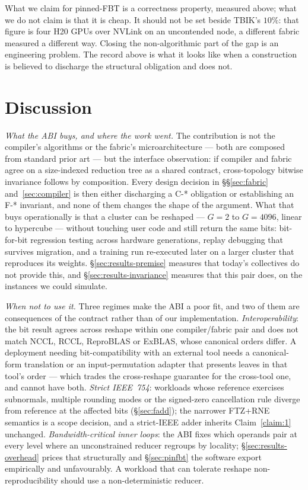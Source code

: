 \documentclass[journal,10pt]{IEEEtran}
\theoremstyle{plain}
\theoremstyle{definition}
\theoremstyle{remark}
\begin{document}
What we claim for pinned-FBT is a correctness property, measured above; what
we do not claim is that it is cheap. It should not be set beside
TBIK's $10\%$: that figure is four H20 GPUs over NVLink on an uncontended
node, a different fabric measured a different way. Closing the
non-algorithmic part of the gap is an engineering problem. The record above is
what it looks like when a construction is believed to discharge the structural
obligation and does not.


\section{Discussion}\label{sec:discussion}

\emph{What the ABI buys, and where the work went.} The contribution is not
the compiler's algorithms or the fabric's microarchitecture --- both are
composed from standard prior art --- but the interface observation: if
compiler and fabric agree on a size-indexed reduction tree as a shared
contract, cross-topology bitwise invariance follows by composition. Every
design decision in \S\S\ref{sec:fabric} and~\ref{sec:compiler} is then either
discharging a \textsf{C-*} obligation or establishing an \textsf{F-*}
invariant, and none of them changes the shape of the argument. What that buys
operationally is that a cluster can be reshaped --- $G = 2$ to $G = 4096$,
linear to hypercube --- without touching user code and still return the same
bits: bit-for-bit regression testing across hardware generations, replay
debugging that survives migration, and a training run re-executed later on a
larger cluster that reproduces its weights. \S\ref{sec:results-premise}
measures that today's collectives do not provide this, and
\S\ref{sec:results-invariance} measures that this pair does, on the instances
we could simulate.

\emph{When not to use it.} Three regimes make the ABI a poor fit, and two of
them are consequences of the contract rather than of our implementation.
\emph{Interoperability}: the bit result agrees across reshape within one
compiler/fabric pair and does not match NCCL, RCCL, ReproBLAS or ExBLAS,
whose canonical orders differ. A deployment needing bit-compatibility with an
external tool needs a canonical-form translation or an input-permutation
adapter that presents leaves in that tool's order --- which trades the
cross-reshape guarantee for the cross-tool one, and cannot have both.
\emph{Strict IEEE~754}: workloads whose reference exercises subnormals,
multiple rounding modes or the signed-zero cancellation rule diverge from
reference at the affected bits (\S\ref{sec:fadd}); the narrower FTZ+RNE
semantics is a scope decision, and a strict-IEEE adder inherits
Claim~\ref{claim:1} unchanged. \emph{Bandwidth-critical inner loops}: the ABI
fixes which operands pair at every level where an unconstrained reducer
regroups by locality; \S\ref{sec:results-overhead} prices that structurally
and \S\ref{sec:pinfbt} the software export empirically and unfavourably. A
workload that can tolerate reshape non-reproducibility should use a
non-deterministic reducer.
\end{document}
